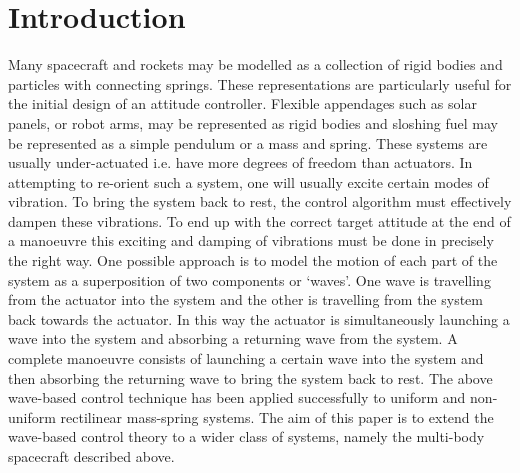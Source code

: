 \documentclass{mbd_fullpaper}
\begin{document}
\section{Introduction}
Many spacecraft and rockets may be modelled as a collection of rigid bodies and particles with connecting springs.
These representations are particularly useful for the initial design of an attitude controller.
Flexible appendages such as solar panels, or robot arms, may be represented as rigid bodies and sloshing fuel may be represented as a simple pendulum or a mass and spring.
These systems are usually under-actuated i.e. have more degrees of freedom than actuators.
In attempting to re-orient such a system, one will usually excite certain modes of vibration.
To bring the system back to rest, the control algorithm must effectively dampen these vibrations.
To end up with the correct target attitude at the end of a manoeuvre this exciting and damping of vibrations must be done in precisely the right way.
One possible approach is to model the motion of each part of the system as a superposition of two components or `waves'.
One wave is travelling from the actuator into the system and the other is travelling from the system back towards the actuator.
In this way the actuator is simultaneously launching a wave into the system and absorbing a returning wave from the system.
A complete manoeuvre consists of launching a certain wave into the system and then absorbing the returning wave to bring the system back to rest.
The above wave-based control technique has been applied successfully to uniform and non-uniform rectilinear mass-spring systems.
The aim of this paper is to extend the wave-based control theory to a wider class of systems, namely the multi-body spacecraft described above. 
\end{document}
